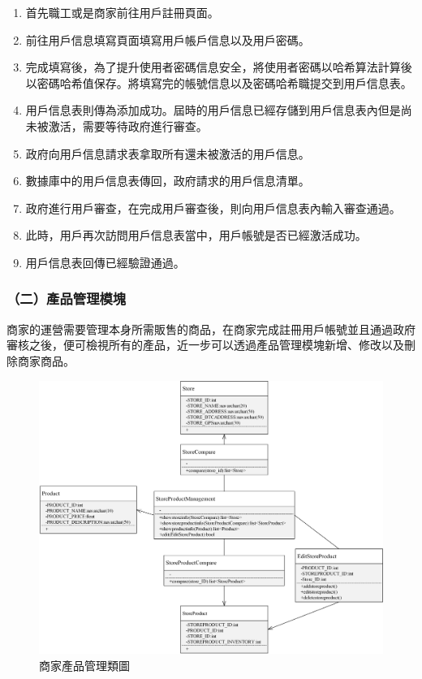 	\begin{enumerate}
	\item 首先職工或是商家前往用戶註冊頁面。
	\item 前往用戶信息填寫頁面填寫用戶帳戶信息以及用戶密碼。
	\item 完成填寫後，為了提升使用者密碼信息安全，將使用者密碼以哈希算法計算後以密碼哈希值保存。將填寫完的帳號信息以及密碼哈希職提交到用戶信息表。
	\item 用戶信息表則傳為添加成功。屆時的用戶信息已經存儲到用戶信息表內但是尚未被激活，需要等待政府進行審查。
	\item 政府向用戶信息請求表拿取所有還未被激活的用戶信息。
	\item 數據庫中的用戶信息表傳回，政府請求的用戶信息清單。
	\item 政府進行用戶審查，在完成用戶審查後，則向用戶信息表內輸入審查通過。
	\item 此時，用戶再次訪問用戶信息表當中，用戶帳號是否已經激活成功。
	\item 用戶信息表回傳已經驗證通過。
	\end{enumerate}


\subsubsection{（二）產品管理模塊}
商家的運營需要管理本身所需販售的商品，在商家完成註冊用戶帳號並且通過政府審核之後，便可檢視所有的產品，近一步可以透過產品管理模塊新增、修改以及刪除商家商品。

	\begin{figure}[htbp]
		\centering
		\includegraphics[width = 1\textwidth]{c2.jpg}
		\caption{商家產品管理類圖}\label{c2}
	\end{figure}

